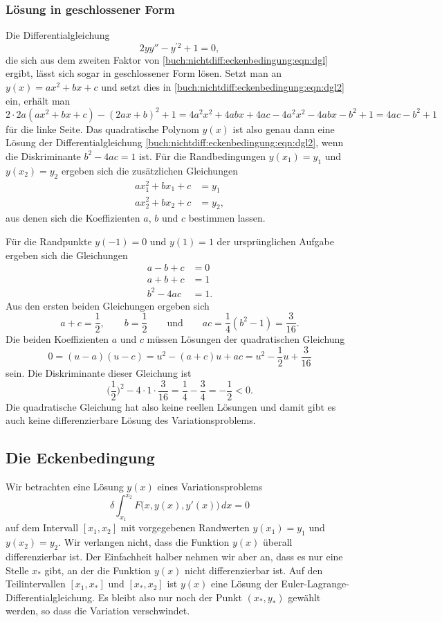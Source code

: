 %
%
\subsubsection{Lösung in geschlossener Form}
Die Differentialgleichung
\begin{equation}
2yy'' - y^{\prime 2} + 1 = 0,
\label{buch:nichtdiff:eckenbedingung:eqn:dgl2}
\end{equation}
die sich aus dem zweiten Faktor von
\eqref{buch:nichtdiff:eckenbedingung:eqn:dgl}
ergibt, lässt sich sogar in geschlossener Form lösen.
Setzt man an $y(x)=ax^2+bx+c$ und setzt dies in
\eqref{buch:nichtdiff:eckenbedingung:eqn:dgl2} ein, erhält man
\[
2\cdot2a(ax^2+bx+c) - (2ax+b)^2 + 1 
=
4a^2x^2 + 4abx + 4ac - 4a^2x^2 -4abx-b^2 + 1
=
4ac-b^2+1
\]
für die linke Seite.
Das quadratische Polynom $y(x)$ ist also genau dann eine Lösung
der Differentialgleichung
\eqref{buch:nichtdiff:eckenbedingung:eqn:dgl2},
wenn die Diskriminante $b^2-4ac=1$ ist.
Für die Randbedingungen $y(x_1)=y_1$ und $y(x_2)=y_2$ ergeben sich die
zusätzlichen Gleichungen
\begin{equation*}
\begin{aligned}
ax_1^2+bx_1+c&=y_1
\\
ax_2^2+bx_2+c&=y_2,
\end{aligned}
\end{equation*}
aus denen sich die Koeffizienten $a$, $b$ und $c$ bestimmen lassen.

Für die Randpunkte $y(-1)=0$ und $y(1)=1$ der ursprünglichen Aufgabe
ergeben sich die Gleichungen
\begin{align*}
a-b+c&=0\\
a+b+c&=1\\
b^2-4ac&=1.
\end{align*}
Aus den ersten beiden Gleichungen ergeben sich
\[
a+c=\frac12, \qquad b=\frac12
\qquad\text{und}\qquad
ac = \frac14(b^2-1) = \frac{3}{16}.
\]
Die beiden Koeffizienten $a$ und $c$ müssen Lösungen der
quadratischen Gleichung
\[
0
=
(u-a)(u-c)
=
u^2 -(a+c)u+ac
=
u^2-\frac12u+\frac{3}{16}
\]
sein.
Die Diskriminante dieser Gleichung ist
\[
\biggl(\frac12\biggr)^2
-4\cdot1\cdot\frac{3}{16}
=
\frac14-\frac{3}{4}
=
-\frac12
<0.
\]
Die quadratische Gleichung hat also keine reellen Lösungen und damit
gibt es auch keine differenzierbare Lösung des Variationsproblems.

%
%
\subsection{Die Eckenbedingung
\label{buch:nichtdiff:eckenbedingung:subsection:eckenbedingung}}
Wir betrachten eine Lösung $y(x)$ eines Variationsproblems 
\[
\delta
\int_{x_1}^{x_2}
F\bigl(x,y(x),y'(x)\bigr)
\,dx
=
0
\]
auf dem Intervall $[x_1,x_2]$ mit vorgegebenen Randwerten 
$y(x_1)=y_1$ und $y(x_2)=y_2$.
Wir verlangen nicht, dass die Funktion $y(x)$ überall differenzierbar
ist.
Der Einfachheit halber nehmen wir aber an, dass es nur eine
Stelle $x_*$ gibt, an der die Funktion $y(x)$ nicht differenzierbar ist.
Auf den Teilintervallen $[x_1,x_*]$ und $[x_*,x_2]$ ist $y(x)$ eine
Lösung der Euler-Lagrange-Differentialgleichung.
Es bleibt also nur noch der Punkt $(x_*,y_*)$ gewählt werden, so dass
die Variation verschwindet.

